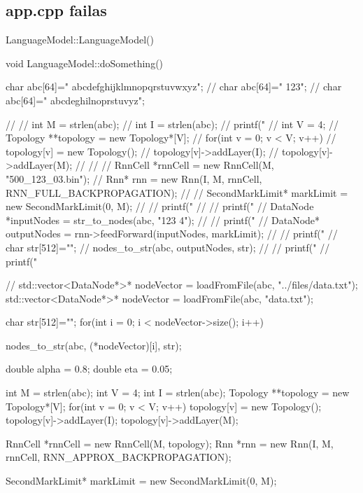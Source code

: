 \subsection{app.cpp failas}

LanguageModel::LanguageModel(){

}

void LanguageModel::doSomething(){

   char abc[64]=" abcdefghijklmnopqrstuvwxyz";
   // char abc[64]=" 123";
   // char abc[64]=" abcdeghilnoprstuvyz";

  //
  // int M = strlen(abc);
  // int I = strlen(abc);
  // printf("%
  // int V = 4;
  // Topology **topology = new Topology*[V];
  // for(int v = 0; v < V; v++){
  //   topology[v] = new Topology();
  //   topology[v]->addLayer(I);
  //   topology[v]->addLayer(M);
  // }
  //
  // RnnCell *rnnCell = new RnnCell(M, "500\_123\_03.bin");
  // Rnn* rnn = new Rnn(I, M, rnnCell, RNN\_FULL\_BACKPROPAGATION);
  //
  // SecondMarkLimit* markLimit = new SecondMarkLimit(0, M);
  //   // printf("%
  //     // printf("%
  // DataNode *inputNodes = str\_to\_nodes(abc, "123 4");
  //   // printf("%
  // DataNode* outputNodes = rnn->feedForward(inputNodes, markLimit);
  //   // printf("%
  // char str[512]="";
  // nodes\_to\_str(abc, outputNodes, str);
  //
  // printf("%
  // printf("%






  // std::vector<DataNode*>* nodeVector = loadFromFile(abc, "../files/data.txt");
  std::vector<DataNode*>* nodeVector = loadFromFile(abc, "data.txt");



  char str[512]="";
  for(int i = 0; i < nodeVector->size(); i++){
    nodes\_to\_str(abc, (*nodeVector)[i], str);

  }



  double alpha = 0.8;
  double eta = 0.05;

  int M = strlen(abc);
  int V = 4;
  int I = strlen(abc);
  Topology **topology = new Topology*[V];
  for(int v = 0; v < V; v++){
    topology[v] = new Topology();
    topology[v]->addLayer(I);
    topology[v]->addLayer(M);
  }

  RnnCell *rnnCell = new RnnCell(M, topology);
  Rnn *rnn = new Rnn(I, M, rnnCell, RNN\_APPROX\_BACKPROPAGATION);

  SecondMarkLimit* markLimit = new SecondMarkLimit(0, M);

}
